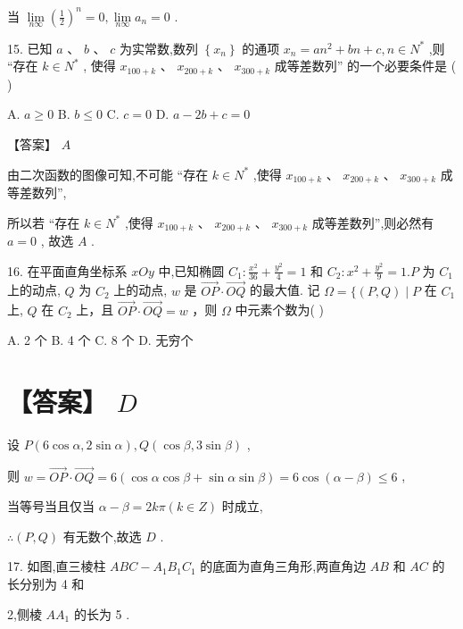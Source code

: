 \documentclass[10pt]{article}
\begin{document}
当 \(\mathop{\lim }\limits_{{n\infty }}{\left( \frac{1}{2}\right) }^{n} = 0,\mathop{\lim }\limits_{{n\infty }}{a}_{n} = 0\) .

15. 已知 \(a\text{ 、 }b\text{ 、 }c\) 为实常数,数列 \(\left\{  {x}_{n}\right\}\) 的通项 \({x}_{n} = a{n}^{2} + {bn} + c,n \in  {N}^{ * }\) ,则 “存在 \(k \in  {N}^{ * }\) , 使得 \({x}_{{100} + k}\text{ 、 }{x}_{{200} + k}\text{ 、 }{x}_{{300} + k}\) 成等差数列” 的一个必要条件是 ( )

A. \(a \geq  0\) B. \(b \leq  0\) C. \(c = 0\) D. \(a - {2b} + c = 0\)

【答案】 \(A\)

由二次函数的图像可知,不可能 “存在 \(k \in  {N}^{ * }\) ,使得 \({x}_{{100} + k}\text{ 、 }{x}_{{200} + k}\text{ 、 }{x}_{{300} + k}\) 成等差数列”,

所以若 “存在 \(k \in  {N}^{ * }\) ,使得 \({x}_{{100} + k}\text{ 、 }{x}_{{200} + k}\text{ 、 }{x}_{{300} + k}\) 成等差数列”,则必然有 \(a = 0\) , 故选 \(A\) .

16. 在平面直角坐标系 \({xOy}\) 中,已知椭圆 \({C}_{1} : \frac{{x}^{2}}{36} + \frac{{y}^{2}}{4} = 1\) 和 \({C}_{2} : {x}^{2} + \frac{{y}^{2}}{9} = 1.P\) 为 \({C}_{1}\) 上的动点, \(Q\) 为 \({C}_{2}\) 上的动点, \(w\) 是 \(\overrightarrow{OP} \cdot  \overrightarrow{OQ}\) 的最大值. 记 \(\Omega  = \{ \left( {P,Q}\right)  \mid  P\) 在 \({C}_{1}\) 上, \(Q\) 在 \({C}_{2}\) 上，且 \(\overrightarrow{OP} \cdot  \overrightarrow{OQ} = w\) ，则 \(\Omega\) 中元素个数为( )

A. 2 个 B. 4 个 C. 8 个 D. 无穷个

\section*{【答案】 \(D\)}

设 \(P\left( {6\cos \alpha ,2\sin \alpha }\right) ,Q\left( {\cos \beta ,3\sin \beta }\right)\) ,

则 \(w = \overrightarrow{OP} \cdot  \overrightarrow{OQ} = 6\left( {\cos \alpha \cos \beta  + \sin \alpha \sin \beta }\right)  = 6\cos \left( {\alpha  - \beta }\right)  \leq  6\) ,

当等号当且仅当 \(\alpha  - \beta  = {2k\pi }\left( {k \in  Z}\right)\) 时成立,

\(\therefore \left( {P,Q}\right)\) 有无数个,故选 \(D\) .

17. 如图,直三棱柱 \({ABC} - {A}_{1}{B}_{1}{C}_{1}\) 的底面为直角三角形,两直角边 \({AB}\) 和 \({AC}\) 的长分别为 4 和

2,侧棱 \(A{A}_{1}\) 的长为 5 .
\end{document}
